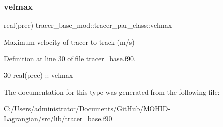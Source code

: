 \subsubsection{\texorpdfstring{velmax}{velmax}}
{\footnotesize\ttfamily real(prec) tracer\+\_\+base\+\_\+mod\+::tracer\+\_\+par\+\_\+class\+::velmax\hspace{0.3cm}{\ttfamily [private]}}



Maximum velocity of tracer to track (m/s) 



Definition at line 30 of file tracer\+\_\+base.\+f90.


\begin{DoxyCode}
30         \textcolor{keywordtype}{real(prec)} :: velmax
\end{DoxyCode}


The documentation for this type was generated from the following file\+:\begin{DoxyCompactItemize}
\item 
C\+:/\+Users/administrator/\+Documents/\+Git\+Hub/\+M\+O\+H\+I\+D-\/\+Lagrangian/src/lib/\mbox{\hyperlink{tracer__base_8f90}{tracer\+\_\+base.\+f90}}\end{DoxyCompactItemize}
